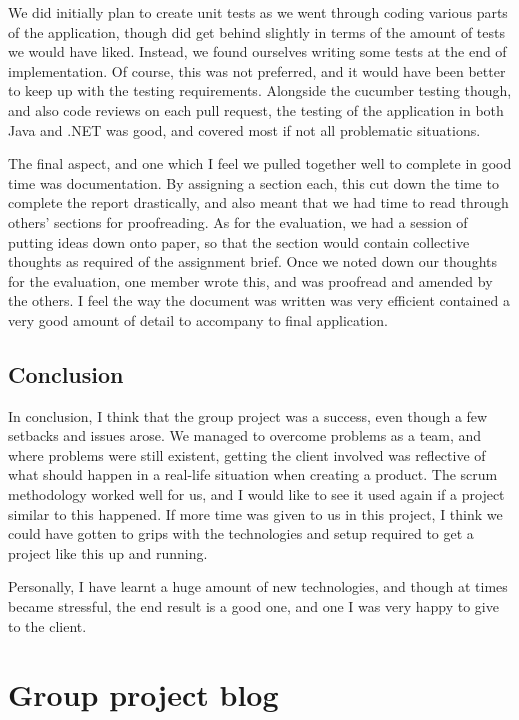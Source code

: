 We did initially plan to create unit tests as we went through coding various parts of the application, though did get behind slightly in terms of the amount of tests we would have liked. Instead, we found ourselves writing some tests at the end of implementation. Of course, this was not preferred, and it would have been better to keep up with the testing requirements. Alongside the cucumber testing though, and also code reviews on each pull request, the testing of the application in both Java and .NET was good, and covered most if not all problematic situations. \par
The final aspect, and one which I feel we pulled together well to complete in good time was documentation. By assigning a section each, this cut down the time to complete the report drastically, and also meant that we had time to read through others’ sections for proofreading. As for the evaluation, we had a session of putting ideas down onto paper, so that the section would contain collective thoughts as required of the assignment brief. Once we noted down our thoughts for the evaluation, one member wrote this, and was proofread and amended by the others. I feel the way the document was written was very efficient contained a very good amount of detail to accompany to final application.
\section{Conclusion}
In conclusion, I think that the group project was a success, even though a few setbacks and issues arose. We managed to overcome problems as a team, and where problems were still existent, getting the client involved was reflective of what should happen in a real-life situation when creating a product. The scrum methodology worked well for us, and I would like to see it used again if a project similar to this happened. If more time was given to us in this project, I think we could have gotten to grips with the technologies and setup required to get a project like this up and running. \par
Personally, I have learnt a huge amount of new technologies, and though at times became stressful, the end result is a good one, and one I was very happy to give to the client.

\newpage
\appendix
\chapter{Group project blog} \label{App:A}

